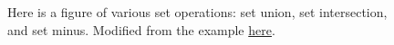 \begin{figure}[t]
    \caption[Set operations]{Here is a figure of various set operations:
        set union, set intersection, and set minus.
        Modified from the example
        \href{https://texample.net/tikz/examples/set-operations-illustrated-with-venn-diagrams/}{here}.}
    \label{fig:math_set_venn}
\end{figure}
